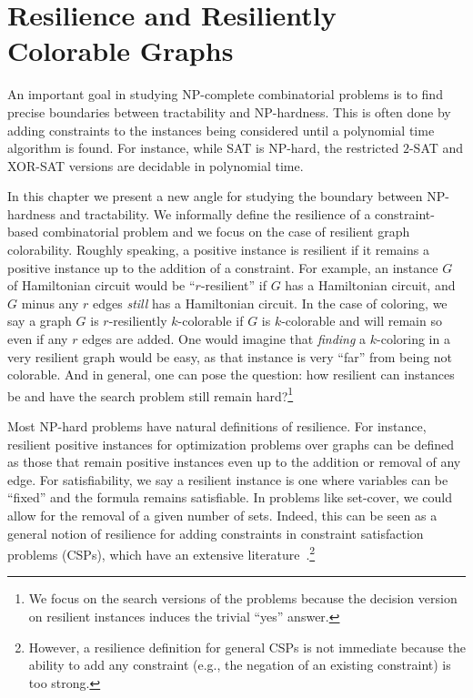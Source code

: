 \chapter{Resilience and Resiliently Colorable Graphs}
\label{chapter:resilience}

An important goal in studying NP-complete combinatorial problems is to find
precise boundaries between tractability and NP-hardness. This is often done by
adding constraints to the instances being considered until a polynomial time
algorithm is found.  For instance, while SAT is NP-hard, the restricted
$2$-SAT and XOR-SAT versions are decidable in polynomial time.  

In this chapter we present a new angle for studying the boundary between
NP-hardness and tractability.  We informally define the resilience of a
constraint-based combinatorial problem and we focus on the case of resilient
graph colorability. Roughly speaking, a positive instance is resilient if it
remains a positive instance up to the addition of a constraint. For example, an
instance $G$ of Hamiltonian circuit would be ``$r$-resilient'' if $G$ has a
Hamiltonian circuit, and $G$ minus any $r$ edges \emph{still} has a Hamiltonian
circuit. In the case of coloring, we say a graph $G$ is $r$-resiliently
$k$-colorable if $G$ is $k$-colorable and will remain so even if any $r$ edges
are added. One would imagine that \emph{finding} a $k$-coloring in a very
resilient graph would be easy, as that instance is very ``far'' from being not
colorable.  And in general, one can pose the question: how resilient can
instances be and have the search problem still remain hard?\footnote{We focus
on the search versions of the problems because the decision version on
resilient instances induces the trivial ``yes'' answer.}

Most NP-hard problems have natural definitions of resilience.  For instance,
resilient positive instances for optimization problems over graphs can be
defined as those that remain positive instances even up to the addition or
removal of any edge.  For satisfiability, we say a resilient instance is one
where variables can be ``fixed'' and the formula remains satisfiable. In
problems like set-cover, we could allow for the removal of a given number of
sets. Indeed, this can be seen as a general notion of resilience for adding
constraints in constraint satisfaction problems (CSPs), which have an extensive
literature~\cite{Kumar92}.\footnote{However, a resilience definition for
general CSPs is not immediate because the ability to add any constraint (e.g.,
the negation of an existing constraint) is too strong.}

